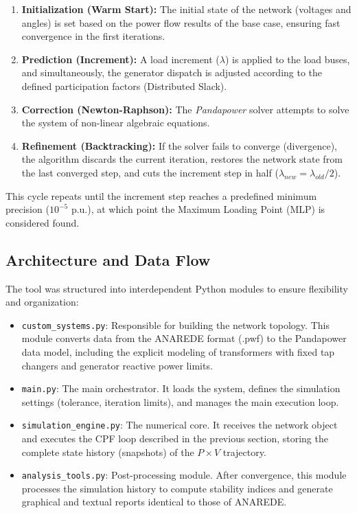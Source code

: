 \documentclass{ieeeaccess}
\begin{document}
\begin{enumerate}
    \item \textbf{Initialization (Warm Start):} The initial state of the network (voltages and angles) is set based on the power flow results of the base case, ensuring fast convergence in the first iterations.
    \item \textbf{Prediction (Increment):} A load increment ($\lambda$) is applied to the load buses, and simultaneously, the generator dispatch is adjusted according to the defined participation factors (Distributed Slack).
    \item \textbf{Correction (Newton-Raphson):} The \textit{Pandapower} solver attempts to solve the system of non-linear algebraic equations.
    \item \textbf{Refinement (Backtracking):} If the solver fails to converge (divergence), the algorithm discards the current iteration, restores the network state from the last converged step, and cuts the increment step in half ($\lambda_{new} = \lambda_{old} / 2$).
\end{enumerate}
This cycle repeats until the increment step reaches a predefined minimum precision ($10^{-5}$ p.u.), at which point the Maximum Loading Point (MLP) is considered found.

\subsection{Architecture and Data Flow}
The tool was structured into interdependent Python modules to ensure flexibility and organization:

\begin{itemize}
    \item \texttt{custom\_systems.py}: Responsible for building the network topology. This module converts data from the ANAREDE format (.pwf) to the Pandapower data model, including the explicit modeling of transformers with fixed tap changers and generator reactive power limits.
    \item \texttt{main.py}: The main orchestrator. It loads the system, defines the simulation settings (tolerance, iteration limits), and manages the main execution loop.
    \item \texttt{simulation\_engine.py}: The numerical core. It receives the network object and executes the CPF loop described in the previous section, storing the complete state history (snapshots) of the $P \times V$ trajectory.
    \item \texttt{analysis\_tools.py}: Post-processing module. After convergence, this module processes the simulation history to compute stability indices and generate graphical and textual reports identical to those of ANAREDE.
\end{itemize}
\end{document}
